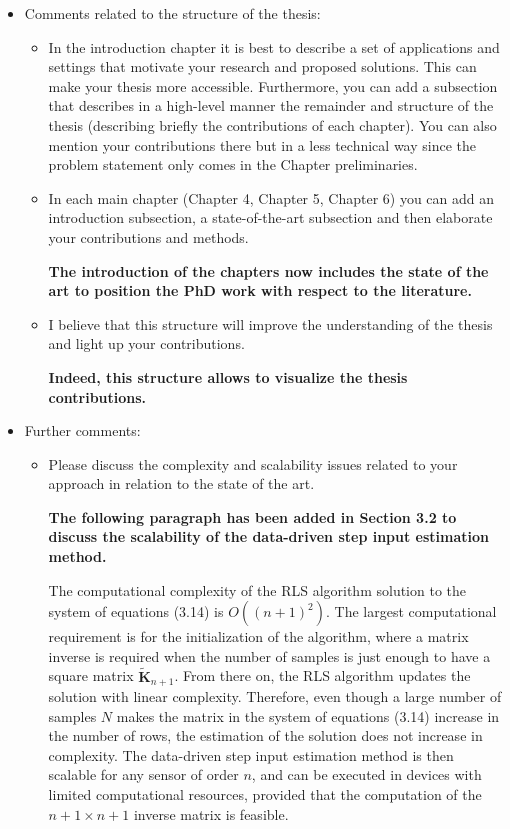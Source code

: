 \documentclass[11pt]{article}
\begin{document}
\begin{itemize}
    \item Comments related to the structure of the thesis:
    \begin{itemize}
	\item In the introduction chapter it is best to describe a set of applications and settings that motivate your research and proposed solutions. This can make your thesis more accessible. Furthermore, you can add a subsection that describes in a high-level manner the remainder and structure of the thesis (describing briefly the contributions of each chapter). You can also mention your contributions there but in a less technical way since the problem statement only comes in the Chapter preliminaries.
	\item In each main chapter (Chapter 4, Chapter 5, Chapter 6) you can add an introduction subsection, a state-of-the-art subsection and then elaborate your contributions and methods.
    
    {\bfseries The introduction of the chapters now includes the state of the art to position the PhD work with respect to the literature.}

	\item I believe that this structure will improve the understanding of the thesis and light up your contributions.
	
	{\bfseries Indeed, this structure allows to visualize the thesis contributions.}

	\end{itemize}
	\item Further comments:
	\begin{itemize}
	\item Please discuss the complexity and scalability issues related to your approach in relation to the state of the art.
	
    {\bfseries The following paragraph has been added in Section 3.2 to discuss the scalability of the data-driven step input estimation method.}
	
	\color{blue}
    The computational complexity of the RLS algorithm solution to the system of equations (3.14) is $O \left( \left( n+1 \right)^2 \right)$.
    The largest computational requirement is for the initialization of the algorithm, where a matrix inverse is required when the number of samples is just enough to have a square matrix $\widetilde{\mathbf{K}}_{n+1}$.
    From there on, the RLS algorithm updates the solution with linear complexity.
    Therefore, even though a large number of samples $N$ makes the matrix in the system of equations (3.14) increase in the number of rows, the estimation of the solution does not increase in complexity. 
    The data-driven step input estimation method is then scalable for any sensor of order $n$, and can be executed in devices with limited computational resources, provided that the computation of the  $n+1 \times n+1$ inverse matrix is feasible.
    \color{black}
	

\end{itemize}
\end{itemize}
\end{document}
